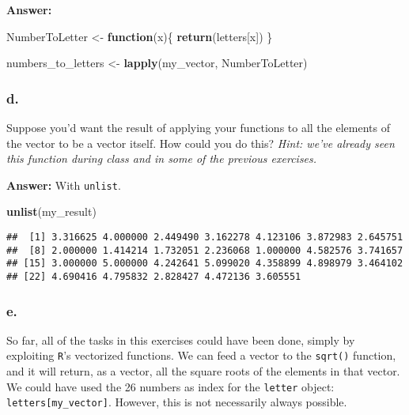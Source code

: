 \documentclass[]{article}
\newenvironment{Shaded}{\begin{snugshade}}{\end{snugshade}}
\newcommand{\ControlFlowTok}[1]{\textcolor[rgb]{0.13,0.29,0.53}{\textbf{#1}}}
\newcommand{\KeywordTok}[1]{\textcolor[rgb]{0.13,0.29,0.53}{\textbf{#1}}}
\newcommand{\NormalTok}[1]{#1}
\newcommand{\StringTok}[1]{\textcolor[rgb]{0.31,0.60,0.02}{#1}}
\begin{document}
\textbf{Answer:}

\begin{Shaded}
\begin{Highlighting}[]
\NormalTok{NumberToLetter <-}\StringTok{ }\ControlFlowTok{function}\NormalTok{(x)\{}
  \KeywordTok{return}\NormalTok{(letters[x])}
\NormalTok{\}}

\NormalTok{numbers_to_letters <-}\StringTok{ }\KeywordTok{lapply}\NormalTok{(my_vector, NumberToLetter)}
\end{Highlighting}
\end{Shaded}

\hypertarget{d.-3}{%
\subsubsection{d.}\label{d.-3}}

Suppose you'd want the result of applying your functions to all the
elements of the vector to be a vector itself. How could you do this?
\emph{Hint: we've already seen this function during class and in some of
the previous exercises.}

\textbf{Answer:} With \texttt{unlist}.

\begin{Shaded}
\begin{Highlighting}[]
\KeywordTok{unlist}\NormalTok{(my_result)}
\end{Highlighting}
\end{Shaded}

\begin{verbatim}
##  [1] 3.316625 4.000000 2.449490 3.162278 4.123106 3.872983 2.645751
##  [8] 2.000000 1.414214 1.732051 2.236068 1.000000 4.582576 3.741657
## [15] 3.000000 5.000000 4.242641 5.099020 4.358899 4.898979 3.464102
## [22] 4.690416 4.795832 2.828427 4.472136 3.605551
\end{verbatim}

\hypertarget{e.-2}{%
\subsubsection{e.}\label{e.-2}}

So far, all of the tasks in this exercises could have been done, simply
by exploiting \texttt{R}'s vectorized functions. We can feed a vector to
the \texttt{sqrt()} function, and it will return, as a vector, all the
square roots of the elements in that vector. We could have used the 26
numbers as index for the \texttt{letter} object:
\texttt{letters{[}my\_vector{]}}. However, this is not necessarily
always possible.
\end{document}
